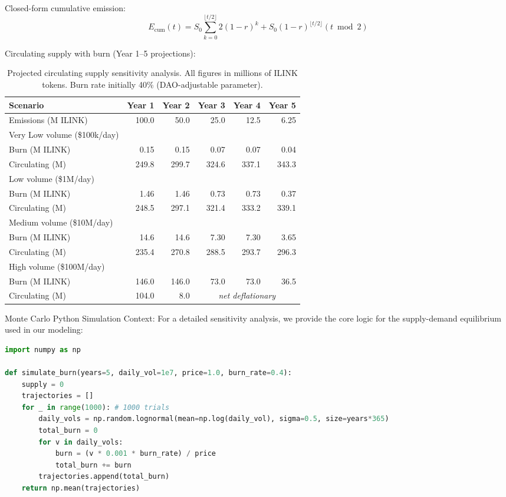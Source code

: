 \documentclass[11pt,a4paper]{article}
\begin{document}
Closed-form cumulative emission:
$$E_{\text{cum}}(t) = S_0 \sum_{k=0}^{\lfloor t/2 \rfloor} 2 (1-r)^k +
  S_0 (1-r)^{\lfloor t/2\rfloor}(t \bmod 2)$$

Circulating supply with burn (Year 1--5 projections):

\begin{table}[H]
\centering
\begin{tabular}{@{}lrrrrr@{}}
\toprule
Scenario & Year 1 & Year 2 & Year 3 & Year 4 & Year 5 \\
\midrule
Emissions (M ILINK) & 100.0 & 50.0 & 25.0 & 12.5 & 6.25 \\
\midrule
Very Low volume (\$100k/day) & & & & & \\
\quad Burn (M ILINK) & 0.15 & 0.15 & 0.07 & 0.07 & 0.04 \\
\quad Circulating (M) & 249.8 & 299.7 & 324.6 & 337.1 & 343.3 \\
\midrule
Low volume (\$1M/day) && & & & \\
\quad Burn (M ILINK) & 1.46 & 1.46 & 0.73 & 0.73 & 0.37 \\
\quad Circulating (M) & 248.5 & 297.1 & 321.4 & 333.2 & 339.1 \\
\midrule
Medium volume (\$10M/day) && & & & \\
\quad Burn (M ILINK) & 14.6 & 14.6 & 7.30 & 7.30 & 3.65 \\
\quad Circulating (M) & 235.4 & 270.8 & 288.5 & 293.7 & 296.3 \\
\midrule
High volume (\$100M/day) && & & & \\
\quad Burn (M ILINK) & 146.0 & 146.0 & 73.0 & 73.0 & 36.5 \\
\quad Circulating (M) & 104.0 & 8.0 & \multicolumn{3}{c}{\textit{net deflationary}} \\
\bottomrule
\end{tabular}
\caption{Projected circulating supply sensitivity analysis.
All figures in millions of ILINK tokens. Burn rate initially 40\% (DAO-adjustable parameter).}
\label{tab:supply-schedule}
\end{table}

\noindent Monte Carlo Python Simulation Context:
For a detailed sensitivity analysis, we provide the core logic for the supply-demand equilibrium used in our modeling:

\begin{lstlisting}[language=Python, caption={Monte Carlo Burn Projection (Snippet)}]
import numpy as np

def simulate_burn(years=5, daily_vol=1e7, price=1.0, burn_rate=0.4):
    supply = 0
    trajectories = []
    for _ in range(1000): # 1000 trials
        daily_vols = np.random.lognormal(mean=np.log(daily_vol), sigma=0.5, size=years*365)
        total_burn = 0
        for v in daily_vols:
            burn = (v * 0.001 * burn_rate) / price
            total_burn += burn
        trajectories.append(total_burn)
    return np.mean(trajectories)
\end{lstlisting}
\end{document}
